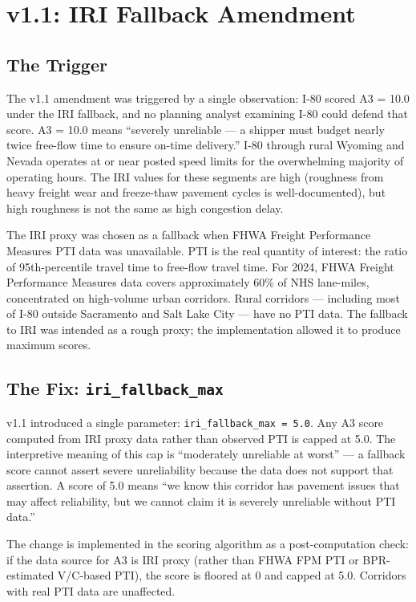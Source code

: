 \section{v1.1: IRI Fallback Amendment}
\label{sec:v11-amendments}

\subsection{The Trigger}

The v1.1 amendment was triggered by a single observation: I-80 scored A3 = 10.0 under the IRI fallback, and no planning analyst examining I-80 could defend that score. A3 = 10.0 means ``severely unreliable --- a shipper must budget nearly twice free-flow time to ensure on-time delivery.'' I-80 through rural Wyoming and Nevada operates at or near posted speed limits for the overwhelming majority of operating hours. The IRI values for these segments are high (roughness from heavy freight wear and freeze-thaw pavement cycles is well-documented), but high roughness is not the same as high congestion delay.

The IRI proxy was chosen as a fallback when FHWA Freight Performance Measures PTI data was unavailable. PTI is the real quantity of interest: the ratio of 95th-percentile travel time to free-flow travel time. For 2024, FHWA Freight Performance Measures data covers approximately 60\% of NHS lane-miles, concentrated on high-volume urban corridors. Rural corridors --- including most of I-80 outside Sacramento and Salt Lake City --- have no PTI data. The fallback to IRI was intended as a rough proxy; the implementation allowed it to produce maximum scores.

\subsection{The Fix: \texttt{iri\_fallback\_max}}

v1.1 introduced a single parameter: \texttt{iri\_fallback\_max = 5.0}. Any A3 score computed from IRI proxy data rather than observed PTI is capped at 5.0. The interpretive meaning of this cap is ``moderately unreliable at worst'' --- a fallback score cannot assert severe unreliability because the data does not support that assertion. A score of 5.0 means ``we know this corridor has pavement issues that may affect reliability, but we cannot claim it is severely unreliable without PTI data.''

The change is implemented in the scoring algorithm as a post-computation check: if the data source for A3 is IRI proxy (rather than FHWA FPM PTI or BPR-estimated V/C-based PTI), the score is floored at 0 and capped at 5.0. Corridors with real PTI data are unaffected.

